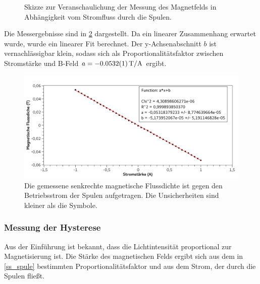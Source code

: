 \documentclass[
	a4paper,
	12pt,
	pagesize,
	ngerman
]{scrartcl}
\begin{document}
	\begin{figure}[H]
		\centering
		\caption{Skizze zur Veranschaulichung der Messung des Magnetfelds in Abhängigkeit vom Stromfluss durch die Spulen.}
		\label{fig_draw}
	\end{figure}
	
	Die Messergebnisse sind in \cref{fig_spule} dargestellt. 
	Da ein linearer Zusammenhang erwartet wurde, wurde ein linearer Fit berechnet.
	Der y-Achsenabschnitt $b$ ist vernachlässigbar klein, sodass sich als Proportionalitätsfaktor zwischen Stromstärke und B-Feld $a= \SI{-0,0532+-0,0001}{T/A}$ ergibt.
	\begin{figure}[H] 
		\includegraphics[width=1\textwidth]{fig_spule}
		\centering
		\caption{Die gemessene senkrechte magnetische Flussdichte ist gegen den Betriebsstrom der Spulen aufgetragen. Die Unsicherheiten sind kleiner als die Symbole.} 
		\label{fig_spule}
		\centering
	\end{figure}

	\subsubsection{Messung der Hysterese}
	Aus der Einführung ist bekannt, dass die Lichtintensität proportional zur Magnetisierung ist.
	Die Stärke des magnetischen Felds ergibt sich aus dem in \cref{ss_spule} bestimmten Proportionalitätsfaktor und aus dem Strom, der durch die Spulen fließt.
\end{document}
